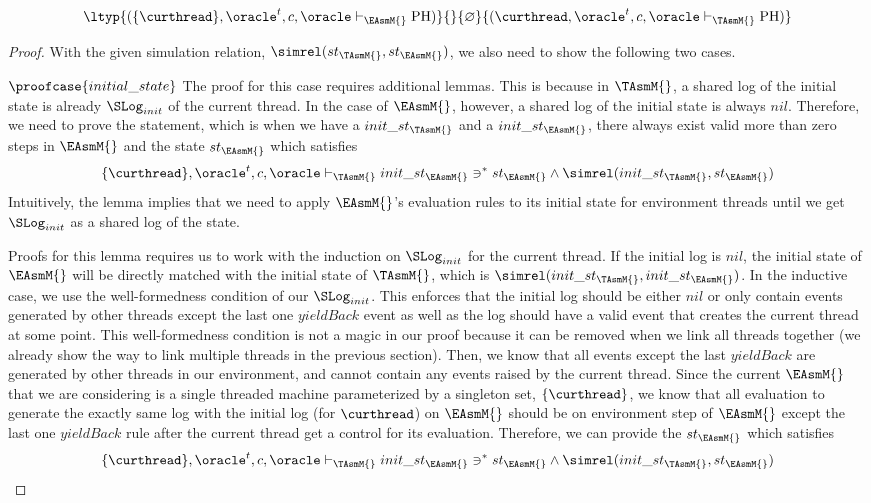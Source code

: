 \begin{theorem}
\begin{small}
$$\ltyp{(\{\curthread\}, \oracle^{t}, c, \oracle  \vdash_{\EAsmM{}} \mathrm{PH})}{}{\varnothing}
{(\curthread, \oracle^{t}, c, \oracle \vdash_{\TAsmM{}} \mathrm{PH})}$$
\end{small}
\label{theorem:tasm-refines-easm}
\end{theorem}
\begin{proof}

With the given simulation relation, $\simrel(st_{\TAsmM{}}, st_{\EAsmM{}})$, we also need to show the following two cases.

$\proofcase{initial\_state}$ 
The proof for this case requires additional lemmas.
This is because in $\TAsmM{}$, a shared log of the initial state is already $\SLog_{init}$ of the current thread.
In the case of $\EAsmM{}$, however, a shared log of the initial state is always $nil$. 
Therefore, we need to prove the statement, which is when we have a $init\_st_\TAsmM{}$ and a $init\_st_\EAsmM{}$, there always exist valid more than zero steps in $\EAsmM{}$ and the state $st_{\EAsmM{}}$ which satisfies
$$ \{\curthread\}, \oracle^{t}, c, \oracle\vdash_{\TAsmM{}} init\_st_{\EAsmM{}} \ni^{*} st_{\EAsmM{}} \wedge \simrel(init\_st_{\TAsmM{}}, st_{\EAsmM{}})$$
Intuitively, the lemma implies that we need to apply $\EAsmM{}$'s evaluation rules to its initial state for environment threads until we get $\SLog_{init}$ as a shared log of the state.

Proofs for this lemma requires us to work with the induction on $\SLog_{init}$ for the current thread.
If the initial log is $nil$, the initial state of $\EAsmM{}$ will be directly matched with the initial state of $\TAsmM{}$, which is $\simrel(init\_st_{\TAsmM{}}, init\_st_{\EAsmM{}})$.
In the inductive case, we use the well-formedness condition of our $\SLog_{init}$. 
This enforces that the initial log should be 
either $nil$ or only contain events generated by other threads except the last one $yieldBack$ event as well as 
the log should have a valid event that creates the current thread at some point.
This well-formedness condition is not a magic in our proof because it can be removed when we link all threads together 
(we already show the way to link multiple threads in the previous section).
Then, we know that all events except the last $yieldBack$ are
 generated by other threads in our environment, and cannot contain
any events raised by the current thread. 
Since the current $\EAsmM{}$ that we are considering is a single threaded machine parameterized by
a singleton set, $\{\curthread\}$, we know that all evaluation to generate the exactly same log with the initial log (for $\curthread$) on $\EAsmM{}$ should be on environment step of $\EAsmM{}$ except the last one $yieldBack$ rule after the current 
thread get a control for its evaluation. 
Therefore, we can provide the $st_{\EAsmM{}}$ which satisfies
$$\{\curthread\}, \oracle^{t}, c, \oracle \vdash_{\TAsmM{}} init\_st_{\EAsmM{}} \ni^{*} st_{\EAsmM{}} \wedge \simrel(init\_st_{\TAsmM{}}, st_{\EAsmM{}})$$



\end{proof}
